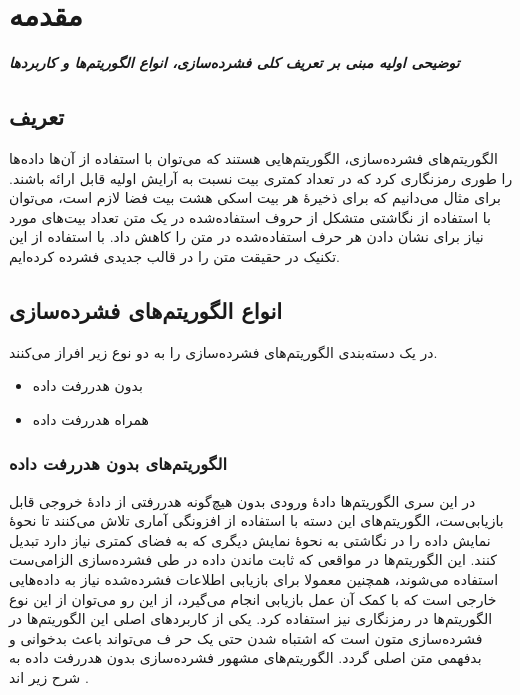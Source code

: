 \chapter{مقدمه}
\noindent
\textbf{
	\textit{
		توضیحی اولیه مبنی بر تعریف کلی فشرده‌سازی، انواع الگوریتم‌ها و کاربردها
	}
}
\pagebreak
\section{تعریف}

الگوریتم‌های فشرده‌سازی، الگوریتم‌هایی هستند که می‌توان با استفاده از آن‌ها داده‌ها را طوری رمزنگاری کرد که در تعداد 	کمتری بیت نسبت به آرایش اولیه
قابل ارائه باشند\cite{data_compression}.
برای مثال می‌دانیم که برای ذخیرهٔ هر بیت اسکی
 هشت بیت فضا لازم است، می‌توان با استفاده از نگاشتی متشکل از حروف استفاده‌شده در 
یک متن تعداد بیت‌های مورد نیاز برای نشان دادن هر حرف استفاده‌شده در متن را کاهش داد.
با استفاده از این تکنیک در حقیقت متن را در قالب جدیدی فشرده کرده‌ایم.

\section{انواع الگوریتم‌های فشرده‌سازی}

در یک دسته‌بندی الگوریتم‌های فشرده‌سازی را به دو نوع زیر افراز می‌کنند.
\begin{itemize}
	\item  بدون هدررفت داده 
	\item  همراه هدررفت داده 
\end{itemize}

\subsection{الگوریتم‌های بدون هدررفت داده}
در این سری الگوریتم‌ها دادهٔ ورودی بدون هیچ‌گونه هدررفتی از دادهٔ خروجی قابل بازیابی‌ست، الگوریتم‌های 
این دسته با استفاده از افزونگی آماری تلاش می‌کنند تا نحوهٔ نمایش داده را در نگاشتی به نحوهٔ نمایش دیگری که به فضای کمتری نیاز دارد 
تبدیل کنند.
این الگوریتم‌ها در مواقعی که 
ثابت ماندن داده در طی فشرده‌سازی الزامی‌ست استفاده می‌شوند، همچنین معمولا برای بازیابی اطلاعات فشرده‌شده نیاز به 
داده‌هایی خارجی است که با کمک آن عمل بازیابی انجام می‌گیرد، از این رو می‌توان از این نوع الگوریتم‌ها در رمزنگاری نیز 
استفاده کرد. یکی از کاربردهای اصلی این الگوریتم‌ها در فشرده‌سازی متون است که اشتباه شدن حتی یک حر	ف می‌تواند باعث بدخوانی و 
بدفهمی متن اصلی گردد. الگوریتم‌های مشهور فشرده‌سازی بدون هدررفت داده به شرح زیر اند \cite{data_types}.

